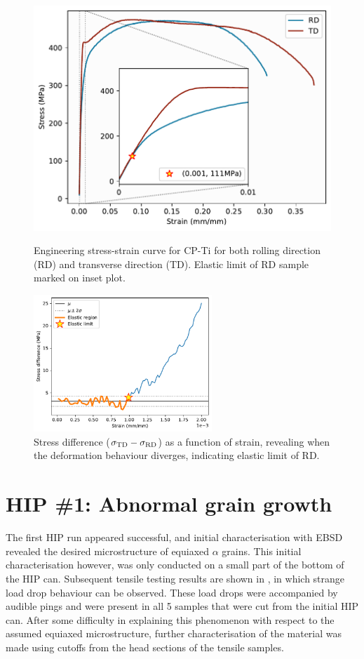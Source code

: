 \begin{figure}[h!]
\centering
  \includegraphics[width=\textwidth]{Figures/tensilePlotInset.pdf}
  \caption{Engineering stress-strain curve for CP-Ti for both rolling direction (RD) and transverse direction (TD). Elastic limit of RD sample marked on inset plot.\label{fig.tensilePlate}}
  \vspace{3\baselineskip}
  \includegraphics[width=0.6\textwidth]{Figures/elastic_limit.pdf}
  \caption{Stress difference ($\sigma_\textnormal{TD}-\sigma_\textnormal{RD}$) as a function of strain, revealing when the deformation behaviour diverges, indicating elastic limit of RD.\label{fig.elasticLimit}}
\end{figure}



\pagebreak
\section{HIP \#1: Abnormal grain growth}
The first HIP run appeared successful, and initial characterisation with EBSD revealed the desired microstructure of equiaxed $\alpha$ grains.
This initial characterisation however, was only conducted on a small part of the bottom of the HIP can.
Subsequent tensile testing results are shown in , in which strange load drop behaviour can be observed.
These load drops were accompanied by audible pings and were present in all 5 samples that were cut from the initial HIP can.
After some difficulty in explaining this phenomenon with respect to the assumed equiaxed microstructure, further characterisation of the material was made using cutoffs from the head sections of the tensile samples.

